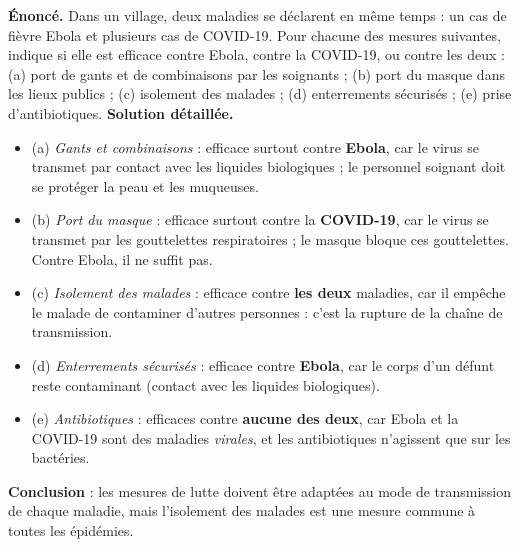 \documentclass[11pt]{article}
\begin{document}
\begin{exoresolu}
\textbf{Énoncé.} Dans un village, deux maladies se déclarent en même temps : un cas de fièvre Ebola et plusieurs cas de COVID-19. Pour chacune des mesures suivantes, indique si elle est efficace contre Ebola, contre la COVID-19, ou contre les deux : (a) port de gants et de combinaisons par les soignants ; (b) port du masque dans les lieux publics ; (c) isolement des malades ; (d) enterrements sécurisés ; (e) prise d'antibiotiques.
\tcblower
\textbf{Solution détaillée.}
\begin{itemize}
\item (a) \emph{Gants et combinaisons} : efficace surtout contre \textbf{Ebola}, car le virus se transmet par contact avec les liquides biologiques ; le personnel soignant doit se protéger la peau et les muqueuses.
\item (b) \emph{Port du masque} : efficace surtout contre la \textbf{COVID-19}, car le virus se transmet par les gouttelettes respiratoires ; le masque bloque ces gouttelettes. Contre Ebola, il ne suffit pas.
\item (c) \emph{Isolement des malades} : efficace contre \textbf{les deux} maladies, car il empêche le malade de contaminer d'autres personnes : c'est la rupture de la chaîne de transmission.
\item (d) \emph{Enterrements sécurisés} : efficace contre \textbf{Ebola}, car le corps d'un défunt reste contaminant (contact avec les liquides biologiques).
\item (e) \emph{Antibiotiques} : efficaces contre \textbf{aucune des deux}, car Ebola et la COVID-19 sont des maladies \emph{virales}, et les antibiotiques n'agissent que sur les bactéries.
\end{itemize}
\textbf{Conclusion} : les mesures de lutte doivent être adaptées au mode de transmission de chaque maladie, mais l'isolement des malades est une mesure commune à toutes les épidémies.
\end{exoresolu}
\end{document}

